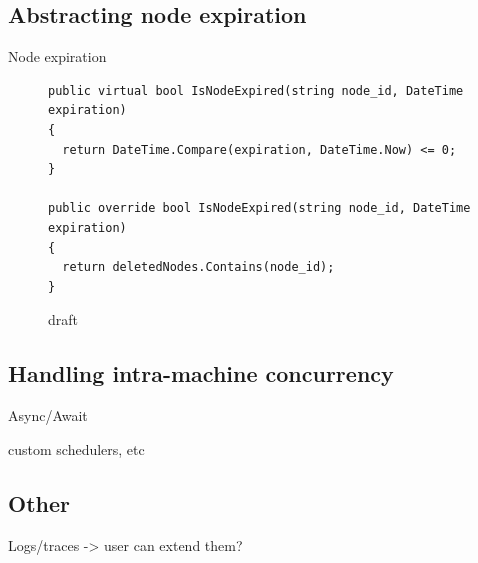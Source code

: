 \subsection{Abstracting node expiration}
\label{sec:method:timers}

Node expiration

\begin{figure}[t]
\begin{lstlisting}
public virtual bool IsNodeExpired(string node_id, DateTime expiration)
{
  return DateTime.Compare(expiration, DateTime.Now) <= 0;
}

public override bool IsNodeExpired(string node_id, DateTime expiration)
{
  return deletedNodes.Contains(node_id);
}
\end{lstlisting}
\vspace{-2mm}
\caption{draft}
\label{fig:expiration}
\end{figure}

\subsection{Handling intra-machine concurrency}
\label{sec:method:async}

Async/Await

custom schedulers, etc

\subsection{Other}
\label{sec:method:other}

Logs/traces -> user can extend them?

